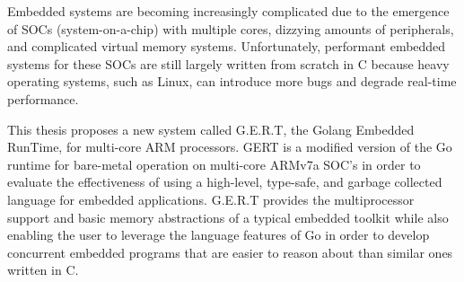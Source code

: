 % 
% 
%

Embedded systems are becoming increasingly complicated due to the emergence of
SOCs (system-on-a-chip) with multiple cores, dizzying amounts of peripherals, and
complicated virtual memory systems. Unfortunately, performant embedded systems
for these SOCs are still largely written from scratch in C because heavy
operating systems, such as Linux, can introduce more bugs and degrade real-time
performance.

This thesis proposes a new system called G.E.R.T, the Golang Embedded RunTime,
for multi-core ARM processors.
GERT is a modified version of the Go runtime for
bare-metal operation on multi-core ARMv7a SOC's in order to evaluate
the effectiveness of using a high-level, type-safe, and garbage collected
language for embedded applications. G.E.R.T
provides the multiprocessor support and basic memory abstractions of a
typical embedded toolkit while also enabling the user to leverage the language features
of Go in order to develop
concurrent embedded programs that are easier to reason about than similar ones
written in C.

